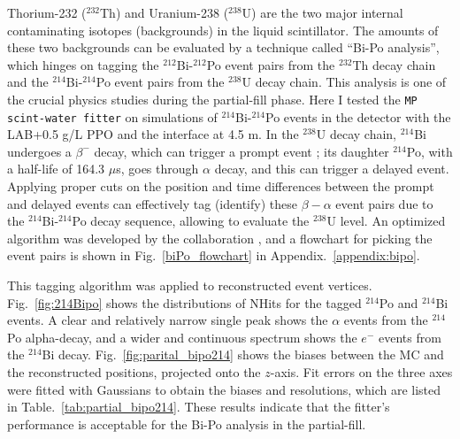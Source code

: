 Thorium-232 ($^{232}$Th) and Uranium-238 ($^{238}$U) are the two major internal contaminating isotopes (backgrounds) in the liquid scintillator. The amounts of these two backgrounds can be evaluated by a technique called ``Bi-Po analysis'', which hinges on tagging the $^{212}$Bi-$^{212}$Po event pairs from the $^{232}$Th decay chain and the $^{214}$Bi-$^{214}$Po event pairs from the $^{238}$U decay chain. This analysis is one of the crucial physics studies during the partial-fill phase. Here I tested the \texttt{MP scint-water fitter} on simulations of $^{214}$Bi-$^{214}$Po events in the detector with the LAB+0.5 g/L PPO and the interface at 4.5 m. In the $^{238}$U decay chain, $^{214}$Bi undergoes a $\beta^-$ decay, which can trigger a prompt event \cite{nndc}; its daughter $^{214}$Po, with a half-life of 164.3 $\mu$s, goes through $\alpha$ decay, and this can trigger a delayed event. Applying proper cuts on the position and time differences between the prompt and delayed events can effectively tag (identify) these $\beta-\alpha$ event pairs due to the $^{214}$Bi-$^{214}$Po decay sequence, allowing to evaluate the $^{238}$U level. An optimized algorithm was developed by the collaboration \cite{joshW1}, and a flowchart for picking the event pairs is shown in Fig.~\ref{biPo_flowchart} in Appendix.~\ref{appendix:bipo}.

This tagging algorithm was applied to reconstructed event vertices. Fig.~\ref{fig:214Bipo} shows the distributions of NHits for the tagged $^{214}$Po and $^{214}$Bi events. A clear and relatively narrow single peak shows the $\alpha$ events from the $^{214}$Po alpha-decay, and a wider and continuous spectrum shows the $e^-$ events from the $^{214}$Bi decay. Fig.~\ref{fig:parital_bipo214} shows the biases between the MC and the reconstructed positions, projected onto the $z$-axis. Fit errors on the three axes were fitted with Gaussians to obtain the biases and resolutions, which are listed in Table.~\ref{tab:partial_bipo214}. These results indicate that the fitter's performance is acceptable for the Bi-Po analysis in the partial-fill.

